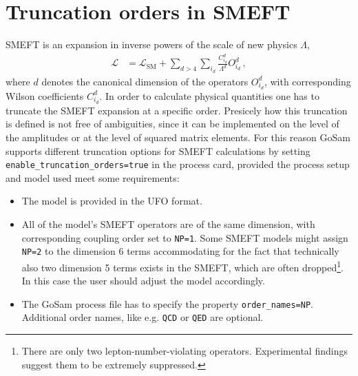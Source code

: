 \documentclass[11pt,a4paper]{refrep}
\newcommand{\gosam}{{\sc GoSam}\xspace}
\begin{document}
\section{Truncation orders in SMEFT}
SMEFT is an expansion in inverse powers of the scale of new physics $\Lambda$,
\begin{align}
   \mathcal{L} &= \mathcal{L}_\mathrm{SM} + \sum_{d>4}\sum_{i_d}\frac{C^d_{i_d}}{\Lambda^d}O^d_{i_d}\,,\label{eq:SMEFTLag}
\end{align}
where $d$ denotes the canonical dimension of the operators $O^d_{i_d}$, with corresponding Wilson coefficients $C^d_{i_d}$. In order to calculate physical quantities one has to truncate the SMEFT expansion at a specific order. Presicely how this truncation is defined is not free of ambiguities, since it can be implemented on the level of the amplitudes or at the level of squared matrix elements. For this reason \gosam supports different truncation options for SMEFT calculations by setting \texttt{enable\_truncation\_orders=true} in the process card, provided the process setup and model used meet some requirements:
\begin{itemize}
   \item The model is provided in the UFO format.
   \item All of the model's SMEFT operators are of the same dimension, with corresponding coupling order set to \texttt{NP=1}. Some SMEFT models might assign \texttt{NP=2} to the dimension 6 terms accommodating for the fact that technically also two dimension 5 terms exists in the SMEFT, which are often dropped\footnote{There are only two lepton-number-violating operators. Experimental findings suggest them to be extremely suppressed.}. In this case the user should adjust the model accordingly.
   \item The \gosam process file has to specify the property \texttt{order\_names=NP}. Additional order names, like e.g. \texttt{QCD} or \texttt{QED} are optional.
\end{itemize}
\end{document}
